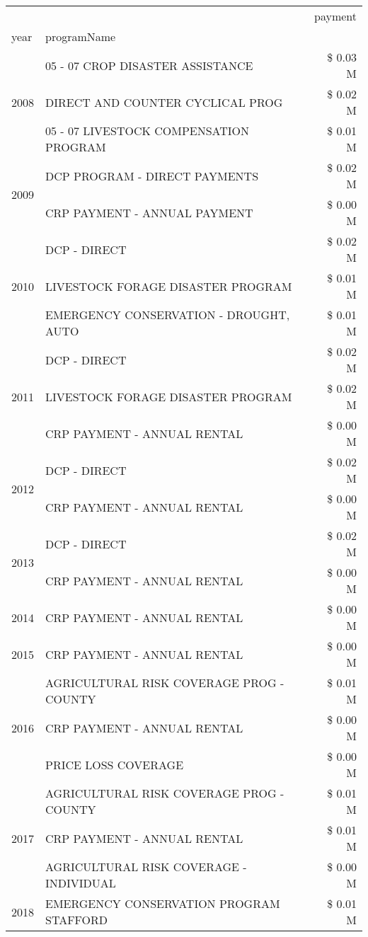 \begin{tabular}{llr}
\toprule
 &  & payment \\
year & programName &  \\
\midrule
\multirow[t]{3}{*}{2008} & 05 - 07 CROP DISASTER ASSISTANCE & \$ 0.03 M \\
 & DIRECT AND COUNTER CYCLICAL PROG & \$ 0.02 M \\
 & 05 - 07 LIVESTOCK COMPENSATION PROGRAM & \$ 0.01 M \\
\cline{1-3}
\multirow[t]{2}{*}{2009} & DCP PROGRAM - DIRECT PAYMENTS & \$ 0.02 M \\
 & CRP PAYMENT - ANNUAL PAYMENT & \$ 0.00 M \\
\cline{1-3}
\multirow[t]{3}{*}{2010} & DCP - DIRECT & \$ 0.02 M \\
 & LIVESTOCK FORAGE DISASTER PROGRAM & \$ 0.01 M \\
 & EMERGENCY CONSERVATION - DROUGHT, AUTO & \$ 0.01 M \\
\cline{1-3}
\multirow[t]{3}{*}{2011} & DCP - DIRECT & \$ 0.02 M \\
 & LIVESTOCK FORAGE DISASTER PROGRAM & \$ 0.02 M \\
 & CRP PAYMENT - ANNUAL RENTAL & \$ 0.00 M \\
\cline{1-3}
\multirow[t]{2}{*}{2012} & DCP - DIRECT & \$ 0.02 M \\
 & CRP PAYMENT - ANNUAL RENTAL & \$ 0.00 M \\
\cline{1-3}
\multirow[t]{2}{*}{2013} & DCP - DIRECT & \$ 0.02 M \\
 & CRP PAYMENT - ANNUAL RENTAL & \$ 0.00 M \\
\cline{1-3}
2014 & CRP PAYMENT - ANNUAL RENTAL & \$ 0.00 M \\
\cline{1-3}
2015 & CRP PAYMENT - ANNUAL RENTAL & \$ 0.00 M \\
\cline{1-3}
\multirow[t]{3}{*}{2016} & AGRICULTURAL RISK COVERAGE PROG - COUNTY & \$ 0.01 M \\
 & CRP PAYMENT - ANNUAL RENTAL & \$ 0.00 M \\
 & PRICE LOSS COVERAGE & \$ 0.00 M \\
\cline{1-3}
\multirow[t]{3}{*}{2017} & AGRICULTURAL RISK COVERAGE PROG - COUNTY & \$ 0.01 M \\
 & CRP PAYMENT - ANNUAL RENTAL & \$ 0.01 M \\
 & AGRICULTURAL RISK COVERAGE - INDIVIDUAL & \$ 0.00 M \\
\cline{1-3}
\multirow[t]{3}{*}{2018} & EMERGENCY CONSERVATION PROGRAM STAFFORD & \$ 0.01 M \\

\end{tabular}
